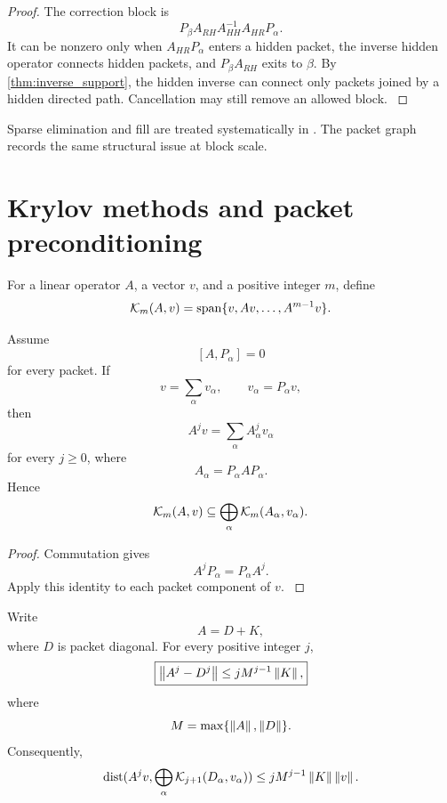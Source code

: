 \begin{proof}\label{main:proof:032}
The correction block is
\[
P_\beta A_{RH}A_{HH}^{-1}A_{HR}P_\alpha.
\]
It can be nonzero only when \(A_{HR}P_\alpha\) enters a hidden packet, the inverse hidden operator connects hidden packets, and \(P_\beta A_{RH}\) exits to \(\beta\). By \cref{thm:inverse_support}, the hidden inverse can connect only packets joined by a hidden directed path. Cancellation may still remove an allowed block.
\label{main:proof:032:end}\end{proof}

Sparse elimination and fill are treated systematically in \cite{Davis2006}. The packet graph records the same structural issue at block scale.

\section{Krylov methods and packet preconditioning}\label{main:section:007}\label{sec:krylov}

\begin{definition}\label{main:definition:010}\label{def:krylov}
For a linear operator \(A\), a vector \(v\), and a positive integer \(m\), define
\[
\Kcal_m(A,v)
=
\operatorname{span}
\{v,Av,\ldots,A^{m-1}v\}.
\]
\end{definition}

\begin{proposition}\label{main:proposition:007}\label{prop:krylov_invariant}
Assume
\[
[A,P_\alpha]=0
\]
for every packet. If
\[
v=\sum_\alpha v_\alpha,
\qquad
v_\alpha=P_\alpha v,
\]
then
\[
A^jv
=
\sum_\alpha A_\alpha^jv_\alpha
\]
for every \(j\geq0\), where
\[
A_\alpha=P_\alpha AP_\alpha.
\]
Hence
\[
\Kcal_m(A,v)
\subseteq
\bigoplus_\alpha
\Kcal_m(A_\alpha,v_\alpha).
\]
\end{proposition}

\begin{proof}\label{main:proof:033}
Commutation gives
\[
A^jP_\alpha=P_\alpha A^j.
\]
Apply this identity to each packet component of \(v\).
\label{main:proof:033:end}\end{proof}

\begin{theorem}\label{main:theorem:017}\label{thm:approx_krylov}
Write
\[
A=D+K,
\]
where \(D\) is packet diagonal. For every positive integer \(j\),
\[
\boxed{
\left\lVert A^j-D^j\right\rVert
\leq
jM^{j-1}\left\lVert K\right\rVert,
}
\]
where
\[
M=\max\{\left\lVert A\right\rVert,\left\lVert D\right\rVert\}.
\]
Consequently,
\[
\dist(A^jv,\bigoplus_\alpha\Kcal_{j+1}(D_\alpha,v_\alpha))
\leq
jM^{j-1}\norm{K}\norm{v}.
\]
\end{theorem}

